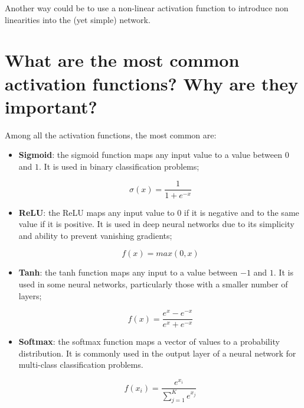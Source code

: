 \documentclass{article}
\begin{document}
Another way could be to use a non-linear activation function to introduce non linearities into the (yet simple) network.

\newpage

\section*{What are the most common activation functions? Why are they important?}

Among all the activation functions, the most common are:

\begin{itemize}
    \item \textbf{Sigmoid}: the sigmoid function maps any input value to a value between $0$ and $1$. It is used in binary classification problems;

    \begin{equation*}
        \sigma(x) = \frac{1}{1 + e^{-x}}
    \end{equation*}
    
    \item \textbf{ReLU}: the ReLU maps any input value to $0$ if it is negative and to the same value if it is positive. It is used in deep neural networks due to its simplicity and ability to prevent vanishing gradients;

    \begin{equation*}
        f(x) = max(0, x)
    \end{equation*}
    
    \item \textbf{Tanh}: the tanh function maps any input to a value between $-1$ and $1$. It is used in some neural networks, particularly those with a smaller number of layers;

    \begin{equation*}
        f(x) = \frac{e^{x}-e^{-x}}{e^{x}+e^{-x}}            
    \end{equation*}
    
    \item \textbf{Softmax}: the softmax function maps a vector of values to a probability distribution. It is commonly used in the output layer of a neural network for multi-class classification problems.

    \begin{equation*}
        f(x_i) = \frac{e^{x_i}}{\sum_{j=1}^{K}e^{x_j}}
    \end{equation*}
    
\end{itemize}
\end{document}
